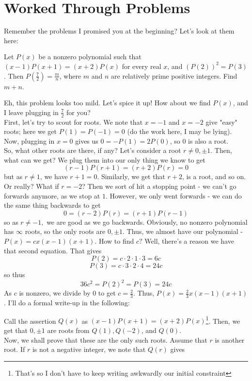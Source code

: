 \documentclass[11pt,titlepage]{scrartcl}
\begin{document}
\section{Worked Through Problems}
Remember the problems I promised you at the beginning? Let's look at them here:
\begin{example}
Let $P(x)$ be a nonzero polynomial such that $(x-1)P(x+1)=(x+2)P(x)$ for every real $x$, and $\left(P(2)\right)^2 = P(3)$. Then $P(\tfrac72)=\tfrac{m}{n}$, where $m$ and $n$ are relatively prime positive integers. Find $m + n$.
\end{example}
\begin{soln}
Eh, this problem looks too mild. Let's spice it up! How about we find $P(x)$, and I leave plugging in $\tfrac 72$ for you?\\[2\baselineskip]
First, let's try to scout for roots. We note that $x=-1$ and $x=-2$ give "easy" roots; here we get $P(1)=P(-1)=0$ (do the work here, I may be lying). Now, plugging in $x=0$ gives us $0=-P(1)=2P(0)$, so $0$ is also a root.\\[2\baselineskip]
So, what other roots are there, if any? Let's consider a root $r\neq 0,\pm 1$. Then, what can we get? We plug them into our only thing we know to get
\[(r-1)P(r+1)=(r+2)P(r)=0\]
but as $r\neq 1$, we have $r+1=0$. Similarly, we get that $r+2$, is a root, and so on.\\[2\baselineskip]
Or really? What if $r=-2$? Then we sort of hit a stopping point - we can't go forwards anymore, as we stop at $1$. However, we only went forwards - we can do the same thing backwards to get
\[0=(r-2)P(r)=(r+1)P(r-1)\]
so as $r\neq -1,$ we are good as we go backwards. Obviously, no nonzero polynomial has $\infty$ roots, so the only roots are $0,\pm 1$. Thus, we almost have our polynomial - $P(x)=cx(x-1)(x+1)$. How to find $c?$ Well, there's a reason we have that second equation. That gives
\[P(2)=c\cdot 2\cdot 1\cdot 3=6c\]
\[P(3)=c\cdot 3\cdot 2\cdot 4=24c\]
so thus
\[36c^2=P(2)^2=P(3)=24c\]
As $c$ is nonzero, we divide by $0$ to get $c=\tfrac 23$. Thus, $P(x)=\tfrac 23x(x-1)(x+1)$. I'll do a formal write-up in the following:
\begin{formal_proof}
Call the assertion $Q(x)$ as $(x-1)P(x+1)=(x+2)P(x)$\footnote{That's so I don't have to keep writing awkwardly our initial constraint}. Then, we get that $0,\pm 1$ are roots from $Q(1),Q(-2)$, and $Q(0).$\\[2\baselineskip]
Now, we shall prove that these are the only such roots. Assume that $r$ is another root. If $r$ is not a negative integer, we note that $Q(r)$ gives

\end{formal_proof}
\end{soln}
\end{document}
